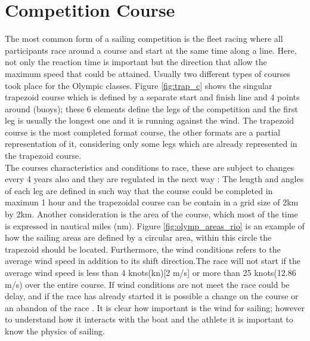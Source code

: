 \section{Competition Course}\label{tracks}
The most common form of a sailing competition is the fleet racing where all participants race around a course and start at the same time along a line. Here, not only the reaction time is important but the direction that allow the maximum speed that could be attained. Usually two different types of courses took place for the Olympic classes. Figure \ref{fig:trap_c} shows the singular trapezoid course which is defined by a separate start and finish line and 4 points around (buoys); these 6 elements define the legs of the competition and the first leg is usually the longest one and it is running against the wind.
The trapezoid course is the most completed format course, the other formats are a partial representation of it, considering only some legs which are already represented in the trapezoid course.\\

The courses characteristics and conditions to race, these are subject to changes every 4 years also and they are regulated in the next way \cite{race_pol}: The length and angles of each leg are defined in such way that the course could be completed in maximun 1 hour and the trapezoidal course can be contain in a grid size of 2km by 2km.  Another consideration is the area of the course,  which most of the time is expressed in nautical miles (nm). Figure \ref{fig:olymp_areas_rio} is an example of how the sailing areas are defined by a circular area, within this circle the trapezoid should be located. Furthermore, the wind conditions refers to the average wind speed in addition to its shift direction.The race will not start if the average wind speed is less than 4 knots(kn)[2 m/s] or more than 25 knots(12.86 m/s) over the entire course. %
If wind conditions are not meet the race could be delay, and if the race has already started it is possible a change on the course or an abandon of the race \cite{race_pol}. It is clear how important is the wind for sailing; however to understand how it interacts with the boat and the athlete it is important to know the physics of sailing. \\

